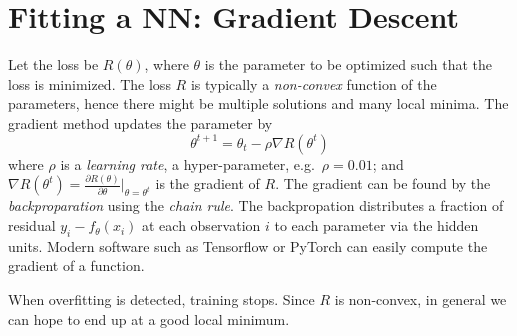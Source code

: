 \documentclass[
  letterpaper,
  DIV=11,
  numbers=noendperiod]{scrreprt}
\begin{document}
\section{Fitting a NN: Gradient
Descent}\label{fitting-a-nn-gradient-descent}

Let the loss be \(R(\theta)\), where \(\theta\) is the parameter to be
optimized such that the loss is minimized. The loss \(R\) is typically a
\emph{non-convex} function of the parameters, hence there might be
multiple solutions and many local minima. The gradient method updates
the parameter by \[
\theta^{t+1} = \theta_t - \rho \nabla R(\theta^t)
\] where \(\rho\) is a \emph{learning rate}, a hyper-parameter,
e.g.~\(\rho=0.01\); and
\(\nabla R(\theta^t) =\frac{\partial R(\theta)}{\partial \theta}|_{\theta = \theta^t}\)
is the gradient of \(R\). The gradient can be found by the
\emph{backproparation} using the \emph{chain rule}. The backpropation
distributes a fraction of residual \(y_i-f_\theta(x_i)\) at each
observation \(i\) to each parameter via the hidden units. Modern
software such as Tensorflow or PyTorch can easily compute the gradient
of a function.

When overfitting is detected, training stops. Since \(R\) is non-convex,
in general we can hope to end up at a good local minimum.
\end{document}
